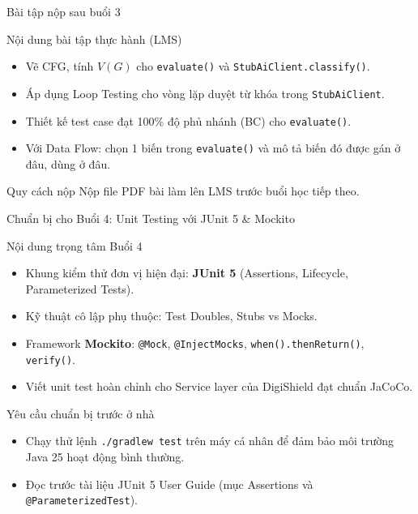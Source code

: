 \documentclass[aspectratio=169,12pt]{beamer}
\begin{document}
\begin{frame}[shrink=8]{Bài tập nộp sau buổi 3}
  \begin{block}{Nội dung bài tập thực hành (LMS)}
    \small
    \begin{itemize}\setlength{\itemsep}{0.25em}
      \item Vẽ CFG, tính $V(G)$ cho \texttt{evaluate()} và \texttt{StubAiClient.classify()}.
      \item Áp dụng Loop Testing cho vòng lặp duyệt từ khóa trong \texttt{StubAiClient}.
      \item Thiết kế test case đạt 100\% độ phủ nhánh (BC) cho \texttt{evaluate()}.
      \item Với Data Flow: chọn 1 biến trong \texttt{evaluate()} và mô tả
        biến đó được gán ở đâu, dùng ở đâu.
    \end{itemize}
  \end{block}

  \vspace{0.25em}
  \begin{alertblock}{Quy cách nộp}
    \small Nộp file PDF bài làm lên LMS trước buổi học tiếp theo.
  \end{alertblock}
\end{frame}



\begin{frame}[shrink=10]{Chuẩn bị cho Buổi 4: Unit Testing với JUnit 5 \& Mockito}
  \begin{block}{Nội dung trọng tâm Buổi 4}
    \begin{itemize}\setlength{\itemsep}{0.2em}
      \item Khung kiểm thử đơn vị hiện đại: \textbf{JUnit 5} (Assertions, Lifecycle, Parameterized Tests).
      \item Kỹ thuật cô lập phụ thuộc: Test Doubles, Stubs vs Mocks.
      \item Framework \textbf{Mockito}: \texttt{@Mock}, \texttt{@InjectMocks}, \texttt{when().thenReturn()}, \texttt{verify()}.
      \item Viết unit test hoàn chỉnh cho Service layer của DigiShield đạt chuẩn JaCoCo.
    \end{itemize}
  \end{block}

  \vspace{0.2em}
  \begin{block}{Yêu cầu chuẩn bị trước ở nhà}
    \begin{itemize}\setlength{\itemsep}{0.2em}
      \item Chạy thử lệnh \texttt{./gradlew test} trên máy cá nhân để đảm bảo môi trường Java 25 hoạt động bình thường.
      \item Đọc trước tài liệu JUnit 5 User Guide (mục Assertions và \texttt{@ParameterizedTest}).
    \end{itemize}
  \end{block}
\end{frame}
\end{document}
